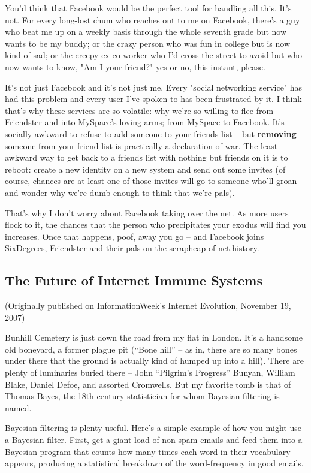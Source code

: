 You'd think that Facebook would be the perfect tool for handling
all this. It's not. For every long-lost chum who reaches out to me
on Facebook, there's a guy who beat me up on a weekly basis through
the whole seventh grade but now wants to be my buddy; or the crazy
person who was fun in college but is now kind of sad; or the creepy
ex-co-worker who I'd cross the street to avoid but who now wants to
know, "Am I your friend?" yes or no, this instant, please.

It's not just Facebook and it's not just me. Every "social
networking service" has had this problem and every user I've spoken
to has been frustrated by it. I think that's why these services are
so volatile: why we're so willing to flee from Friendster and into
MySpace's loving arms; from MySpace to Facebook. It's socially
awkward to refuse to add someone to your friends list -- but
\textbf{removing} someone from your friend-list is practically a
declaration of war. The least-awkward way to get back to a friends
list with nothing but friends on it is to reboot: create a new
identity on a new system and send out some invites (of course,
chances are at least one of those invites will go to someone who'll
groan and wonder why we're dumb enough to think that we're pals).

That's why I don't worry about Facebook taking over the net. As
more users flock to it, the chances that the person who
precipitates your exodus will find you increases. Once that
happens, poof, away you go -- and Facebook joins SixDegrees,
Friendster and their pals on the scrapheap of net.history.

\subsection{The Future of Internet Immune Systems}

(Originally published on InformationWeek's Internet Evolution,
November 19, 2007)

Bunhill Cemetery is just down the road from my flat in London. It’s
a handsome old boneyard, a former plague pit (“Bone hill” -- as in,
there are so many bones under there that the ground is actually
kind of humped up into a hill). There are plenty of luminaries
buried there -- John “Pilgrim’s Progress” Bunyan, William Blake,
Daniel Defoe, and assorted Cromwells. But my favorite tomb is that
of Thomas Bayes, the 18th-century statistician for whom Bayesian
filtering is named.

Bayesian filtering is plenty useful. Here’s a simple example of how
you might use a Bayesian filter. First, get a giant load of
non-spam emails and feed them into a Bayesian program that counts
how many times each word in their vocabulary appears, producing a
statistical breakdown of the word-frequency in good emails.

